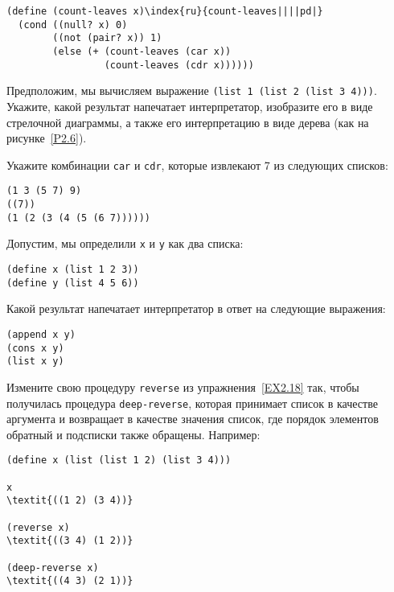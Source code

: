 \begin{Verbatim}[fontsize=\small]
(define (count-leaves x)\index{ru}{count-leaves||||pd|}
  (cond ((null? x) 0)
        ((not (pair? x)) 1)
        (else (+ (count-leaves (car x))
                 (count-leaves (cdr x))))))
\end{Verbatim}
\begin{exercise}{2.24}\label{EX2.24}%
Предположим, мы вычисляем выражение {\tt (list 1 (list 2
(list 3 4)))}. Укажите, какой результат напечатает
интерпретатор, изобразите его в виде стрелочной диаграммы, а также
его интерпретацию в виде дерева (как на рисунке~\ref{P2.6}).
\end{exercise}
\begin{exercise}{2.25}\label{EX2.25}%
Укажите комбинации {\tt car} и {\tt cdr}, 
которые извлекают 7 из следующих списков:

\begin{Verbatim}[fontsize=\small]
(1 3 (5 7) 9)
((7))
(1 (2 (3 (4 (5 (6 7))))))
\end{Verbatim}
\end{exercise}
\begin{exercise}{2.26}\label{EX2.26}%
Допустим, мы определили {\tt x} и {\tt y}
как два списка:

\begin{Verbatim}[fontsize=\small]
(define x (list 1 2 3))
(define y (list 4 5 6))
\end{Verbatim}
Какой результат напечатает интерпретатор в ответ на следующие выражения:

\begin{Verbatim}[fontsize=\small]
(append x y)
(cons x y)
(list x y)
\end{Verbatim}
\end{exercise}
\begin{exercise}{2.27}\label{EX2.27}%
Измените свою процедуру {\tt reverse} из
упражнения~\ref{EX2.18} так, чтобы получилась процедура
{\tt deep-reverse},
которая принимает список в качестве
аргумента и возвращает в качестве значения список, где порядок
элементов обратный и подсписки также обращены.  Например:

\begin{Verbatim}[fontsize=\small]
(define x (list (list 1 2) (list 3 4)))

x
\textit{((1 2) (3 4))}

(reverse x)
\textit{((3 4) (1 2))}

(deep-reverse x)
\textit{((4 3) (2 1))}
\end{Verbatim}
\end{exercise}
